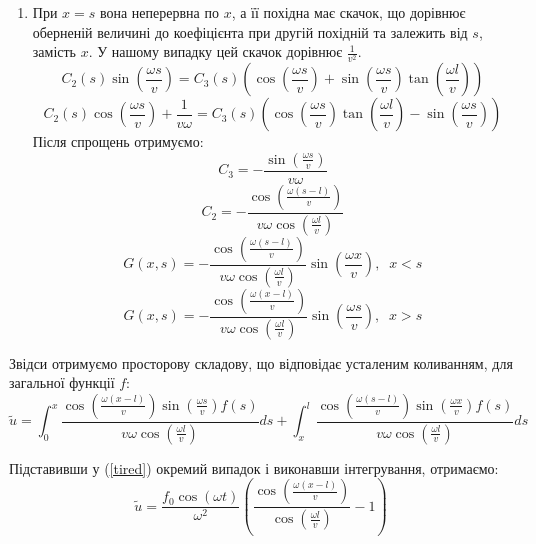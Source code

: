 \begin{enumerate}
  \item При $x=s$ вона неперервна по $x$, а її похідна має скачок, що дорівнює оберненій величині до коефіцієнта при другій похідній та залежить від $s$, замість $x$. У нашому випадку цей скачок дорівнює $\frac{1}{v^2}$.
  \begin{equation*}
    C_2(s)\sin\left(\frac{\omega s}{v}\right)=C_3(s)\left(\cos\left(\frac{\omega s}{v}\right)+\sin\left(\frac{\omega s}{v}\right)\tan\left(\frac{\omega l}{v}\right)\right) 
  \end{equation*}
  \begin{equation*}
    C_2(s)\cos\left(\frac{\omega s}{v}\right)+\frac{1}{v\omega}=C_3(s)\left(\cos\left(\frac{\omega s}{v}\right)\tan\left(\frac{\omega l}{v}\right)-\sin\left(\frac{\omega s}{v}\right)\right)
  \end{equation*}
  Після спрощень отримуємо:
  \begin{equation*}
    C_3=-\frac{\sin\left(\frac{\omega s}{v}\right)}{v\omega}
  \end{equation*}
  \begin{equation*}
    C_2=-\frac{\cos\left(\frac{\omega (s-l)}{v}\right)}{v\omega\cos\left(\frac{\omega l}{v}\right)}
  \end{equation*}
  \begin{equation*}
    G(x,s)=-\frac{\cos\left(\frac{\omega (s-l)}{v}\right)}{v\omega\cos\left(\frac{\omega l}{v}\right)}\sin\left(\frac{\omega x}{v}\right),\;\;x<s 
  \end{equation*}
  \begin{equation*}
    G(x,s)=-\frac{\cos\left(\frac{\omega (x-l)}{v}\right)}{v\omega\cos\left(\frac{\omega l}{v}\right)}\sin\left(\frac{\omega s}{v}\right),\;\;x>s 
  \end{equation*}

\end{enumerate}

Звідси отримуємо просторову складову, що відповідає усталеним коливанням, для загальної функції $f$:
\begin{equation} \label{tired}
    \tilde{u} = \int_0^x\frac{\cos\left(\frac{\omega (x-l)}{v}\right)\sin\left(\frac{\omega s}{v}\right) f(s)}{v\omega\cos\left(\frac{\omega l}{v}\right)}ds+ \int_x^l\frac{\cos\left(\frac{\omega (s-l)}{v}\right)\sin\left(\frac{\omega x}{v}\right) f(s)}{v\omega\cos\left(\frac{\omega l}{v}\right)}ds
\end{equation}

Підставивши у (\ref{tired}) окремий випадок і виконавши інтегрування, отримаємо:
\begin{equation}
    \tilde{u} = \frac {f_0\cos(\omega t)}{\omega^2}\left(\frac{\cos\left(\frac{\omega (x-l)}{v}\right)}{\cos\left(\frac{\omega l}{v}\right)}-1\right)
\end{equation}

